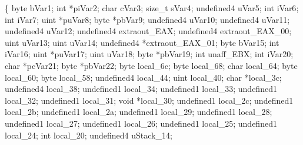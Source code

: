 \documentclass[
]{article}
\newenvironment{Shaded}{}{}
\newcommand{\DataTypeTok}[1]{\textcolor[rgb]{0.56,0.13,0.00}{#1}}
\newcommand{\NormalTok}[1]{#1}
\newcommand{\OperatorTok}[1]{\textcolor[rgb]{0.40,0.40,0.40}{#1}}
\begin{document}
\begin{Shaded}
\begin{Highlighting}[]
\OperatorTok{\{}
\NormalTok{  byte bVar1}\OperatorTok{;}
  \DataTypeTok{int} \OperatorTok{*}\NormalTok{piVar2}\OperatorTok{;}
  \DataTypeTok{char}\NormalTok{ cVar3}\OperatorTok{;}
  \DataTypeTok{size\_t}\NormalTok{ sVar4}\OperatorTok{;}
\NormalTok{  undefined4 uVar5}\OperatorTok{;}
  \DataTypeTok{int}\NormalTok{ iVar6}\OperatorTok{;}
  \DataTypeTok{int}\NormalTok{ iVar7}\OperatorTok{;}
\NormalTok{  uint }\OperatorTok{*}\NormalTok{puVar8}\OperatorTok{;}
\NormalTok{  byte }\OperatorTok{*}\NormalTok{pbVar9}\OperatorTok{;}
\NormalTok{  undefined4 uVar10}\OperatorTok{;}
\NormalTok{  undefined4 uVar11}\OperatorTok{;}
\NormalTok{  undefined4 uVar12}\OperatorTok{;}
\NormalTok{  undefined4 extraout\_EAX}\OperatorTok{;}
\NormalTok{  undefined4 extraout\_EAX\_00}\OperatorTok{;}
\NormalTok{  uint uVar13}\OperatorTok{;}
\NormalTok{  uint uVar14}\OperatorTok{;}
\NormalTok{  undefined4 }\OperatorTok{*}\NormalTok{extraout\_EAX\_01}\OperatorTok{;}
\NormalTok{  byte bVar15}\OperatorTok{;}
  \DataTypeTok{int}\NormalTok{ iVar16}\OperatorTok{;}
\NormalTok{  uint }\OperatorTok{*}\NormalTok{puVar17}\OperatorTok{;}
\NormalTok{  uint uVar18}\OperatorTok{;}
\NormalTok{  byte }\OperatorTok{*}\NormalTok{pbVar19}\OperatorTok{;}
  \DataTypeTok{int}\NormalTok{ unaff\_EBX}\OperatorTok{;}
  \DataTypeTok{int}\NormalTok{ iVar20}\OperatorTok{;}
  \DataTypeTok{char} \OperatorTok{*}\NormalTok{pcVar21}\OperatorTok{;}
\NormalTok{  byte }\OperatorTok{*}\NormalTok{pbVar22}\OperatorTok{;}
\NormalTok{  byte local\_6c}\OperatorTok{;}
\NormalTok{  byte local\_68}\OperatorTok{;}
  \DataTypeTok{char}\NormalTok{ local\_64}\OperatorTok{;}
\NormalTok{  byte local\_60}\OperatorTok{;}
\NormalTok{  byte local\_58}\OperatorTok{;}
\NormalTok{  undefined4 local\_44}\OperatorTok{;}
\NormalTok{  uint local\_40}\OperatorTok{;}
  \DataTypeTok{char} \OperatorTok{*}\NormalTok{local\_3c}\OperatorTok{;}
\NormalTok{  undefined4 local\_38}\OperatorTok{;}
\NormalTok{  undefined1 local\_34}\OperatorTok{;}
\NormalTok{  undefined1 local\_33}\OperatorTok{;}
\NormalTok{  undefined1 local\_32}\OperatorTok{;}
\NormalTok{  undefined1 local\_31}\OperatorTok{;}
  \DataTypeTok{void} \OperatorTok{*}\NormalTok{local\_30}\OperatorTok{;}
\NormalTok{  undefined1 local\_2c}\OperatorTok{;}
\NormalTok{  undefined1 local\_2b}\OperatorTok{;}
\NormalTok{  undefined1 local\_2a}\OperatorTok{;}
\NormalTok{  undefined1 local\_29}\OperatorTok{;}
\NormalTok{  undefined1 local\_28}\OperatorTok{;}
\NormalTok{  undefined1 local\_27}\OperatorTok{;}
\NormalTok{  undefined1 local\_26}\OperatorTok{;}
\NormalTok{  undefined1 local\_25}\OperatorTok{;}
\NormalTok{  undefined1 local\_24}\OperatorTok{;}
  \DataTypeTok{int}\NormalTok{ local\_20}\OperatorTok{;}
\NormalTok{  undefined4 uStack\_14}\OperatorTok{;}


\end{Highlighting}
\end{Shaded}
\end{document}
